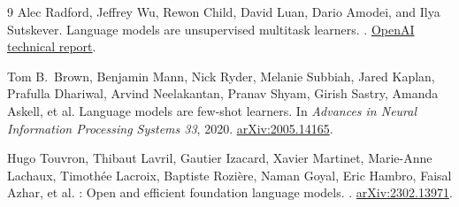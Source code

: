 \documentclass[11pt]{amsart}
\theoremstyle{plain}
\theoremstyle{definition}
\begin{document}
\begin{thebibliography}{9}
Alec Radford, Jeffrey Wu, Rewon Child, David Luan, Dario Amodei, and Ilya
Sutskever.
\newblock Language models are unsupervised multitask learners.
.
\newblock \href{https://cdn.openai.com/better-language-models/language_models_are_unsupervised_multitask_learners.pdf}{OpenAI technical report}.

Tom B.\ Brown, Benjamin Mann, Nick Ryder, Melanie Subbiah, Jared Kaplan,
Prafulla Dhariwal, Arvind Neelakantan, Pranav Shyam, Girish Sastry, Amanda
Askell, et al.
\newblock Language models are few-shot learners.
\newblock In \emph{Advances in Neural Information Processing Systems 33},
  2020.
\newblock \href{https://arxiv.org/abs/2005.14165}{arXiv:2005.14165}.

Hugo Touvron, Thibaut Lavril, Gautier Izacard, Xavier Martinet, Marie-Anne
Lachaux, Timoth\'{e}e Lacroix, Baptiste Rozi\`{e}re, Naman Goyal, Eric
Hambro, Faisal Azhar, et al.
: Open and efficient foundation language models.
.
\newblock \href{https://arxiv.org/abs/2302.13971}{arXiv:2302.13971}.

\end{thebibliography}
\end{document}
